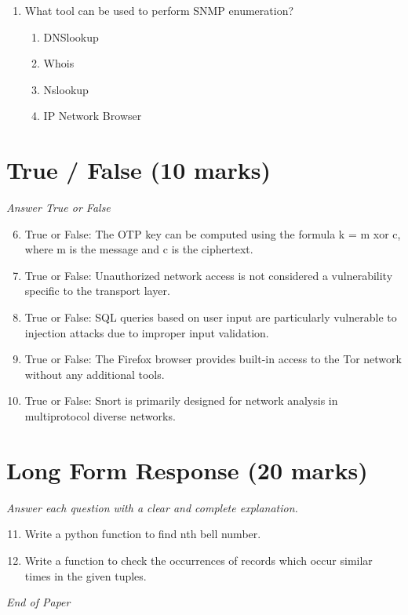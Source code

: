 \documentclass[12pt]{article}
\begin{document}
\begin{enumerate}[label=\arabic*.]
\begin{enumerate}[label=(\alph*)]
    \item No processing power check
    \item No database check
\end{enumerate}
\item What tool can be used to perform SNMP enumeration?
\begin{enumerate}[label=(\alph*)]
    \item DNSlookup
    \item Whois
    \item Nslookup
    \item IP Network Browser
\end{enumerate}
\end{enumerate}

\section*{True / False (10 marks)}
\textit{Answer True or False}
\begin{enumerate}[label=\arabic*.]
\setcounter{enumi}{5}
\item True or False: The OTP key can be computed using the formula k = m xor c, where m is the message and c is the ciphertext.
\item True or False: Unauthorized network access is not considered a vulnerability specific to the transport layer.
\item True or False: SQL queries based on user input are particularly vulnerable to injection attacks due to improper input validation.
\item True or False: The Firefox browser provides built-in access to the Tor network without any additional tools.
\item True or False: Snort is primarily designed for network analysis in multiprotocol diverse networks.
\end{enumerate}

\section*{Long Form Response (20 marks)}
\textit{Answer each question with a clear and complete explanation.}
\begin{enumerate}[label=\arabic*.]
\setcounter{enumi}{10}
\item Write a python function to find nth bell number.
\item Write a function to check the occurrences of records which occur similar times in the given tuples.
\end{enumerate}

\vfill
\noindent\textit{End of Paper}
\end{document}
